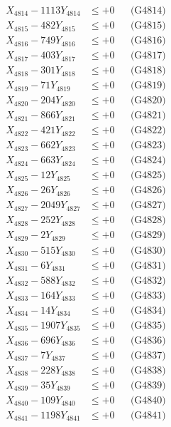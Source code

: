 \documentclass[a4paper,10pt]{article}
\begin{document}
{\begin{align}
X_{4814} - 1113Y_{4814} &\leq +0 && \text{(G4814)} \\
X_{4815} - 482Y_{4815} &\leq +0 && \text{(G4815)} \\
X_{4816} - 749Y_{4816} &\leq +0 && \text{(G4816)} \\
X_{4817} - 403Y_{4817} &\leq +0 && \text{(G4817)} \\
X_{4818} - 301Y_{4818} &\leq +0 && \text{(G4818)} \\
X_{4819} - 71Y_{4819} &\leq +0 && \text{(G4819)} \\
X_{4820} - 204Y_{4820} &\leq +0 && \text{(G4820)} \\
\allowbreak
X_{4821} - 866Y_{4821} &\leq +0 && \text{(G4821)} \\
X_{4822} - 421Y_{4822} &\leq +0 && \text{(G4822)} \\
X_{4823} - 662Y_{4823} &\leq +0 && \text{(G4823)} \\
X_{4824} - 663Y_{4824} &\leq +0 && \text{(G4824)} \\
X_{4825} - 12Y_{4825} &\leq +0 && \text{(G4825)} \\
X_{4826} - 26Y_{4826} &\leq +0 && \text{(G4826)} \\
X_{4827} - 2049Y_{4827} &\leq +0 && \text{(G4827)} \\
X_{4828} - 252Y_{4828} &\leq +0 && \text{(G4828)} \\
X_{4829} - 2Y_{4829} &\leq +0 && \text{(G4829)} \\
X_{4830} - 515Y_{4830} &\leq +0 && \text{(G4830)} \\
\allowbreak
X_{4831} - 6Y_{4831} &\leq +0 && \text{(G4831)} \\
X_{4832} - 588Y_{4832} &\leq +0 && \text{(G4832)} \\
X_{4833} - 164Y_{4833} &\leq +0 && \text{(G4833)} \\
X_{4834} - 14Y_{4834} &\leq +0 && \text{(G4834)} \\
X_{4835} - 1907Y_{4835} &\leq +0 && \text{(G4835)} \\
X_{4836} - 696Y_{4836} &\leq +0 && \text{(G4836)} \\
X_{4837} - 7Y_{4837} &\leq +0 && \text{(G4837)} \\
X_{4838} - 228Y_{4838} &\leq +0 && \text{(G4838)} \\
X_{4839} - 35Y_{4839} &\leq +0 && \text{(G4839)} \\
X_{4840} - 109Y_{4840} &\leq +0 && \text{(G4840)} \\
\allowbreak
X_{4841} - 1198Y_{4841} &\leq +0 && \text{(G4841)} \\

\end{align}}
\end{document}
